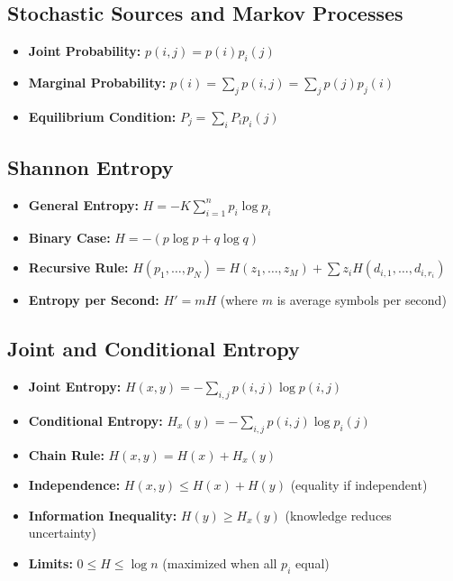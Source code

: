 \documentclass[12pt]{article}
\begin{document}
\subsection*{Stochastic Sources and Markov Processes}
\begin{itemize}
    \item \textbf{Joint Probability:} $p(i, j) = p(i)p_i(j)$
    \item \textbf{Marginal Probability:} $p(i) = \sum_j p(i, j) = \sum_j p(j)p_j(i)$
    \item \textbf{Equilibrium Condition:} $P_j = \sum_i P_i p_i(j)$
\end{itemize}

\subsection*{Shannon Entropy}
\begin{itemize}
    \item \textbf{General Entropy:} $H = -K \sum_{i=1}^n p_i \log p_i$
    \item \textbf{Binary Case:} $H = -(p \log p + q \log q)$
    \item \textbf{Recursive Rule:} $H(p_1, \dots, p_N) = H(z_1, \dots, z_M) + \sum z_i H(d_{i,1}, \dots, d_{i,r_i})$
    \item \textbf{Entropy per Second:} $H' = mH$ (where $m$ is average symbols per second)
\end{itemize}

\subsection*{Joint and Conditional Entropy}
\begin{itemize}
    \item \textbf{Joint Entropy:} $H(x, y) = -\sum_{i,j} p(i, j) \log p(i, j)$
    \item \textbf{Conditional Entropy:} $H_x(y) = -\sum_{i,j} p(i, j) \log p_i(j)$
    \item \textbf{Chain Rule:} $H(x, y) = H(x) + H_x(y)$
    \item \textbf{Independence:} $H(x, y) \leq H(x) + H(y)$ (equality if independent)
    \item \textbf{Information Inequality:} $H(y) \geq H_x(y)$ (knowledge reduces uncertainty)
    \item \textbf{Limits:} $0 \leq H \leq \log n$ (maximized when all $p_i$ equal)
\end{itemize}
\end{document}
